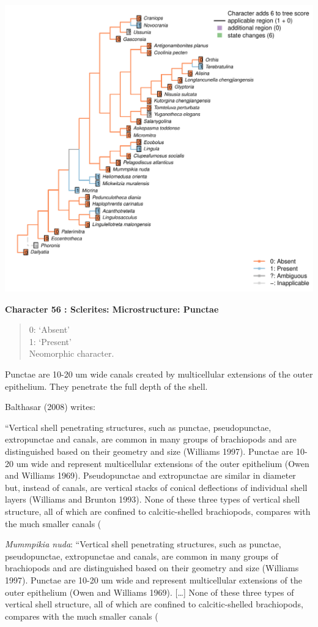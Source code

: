 \documentclass[]{book}
\theoremstyle{definition}
\theoremstyle{definition}
\theoremstyle{definition}
\theoremstyle{remark}
\begin{document}
\includegraphics{Brachiopod_phylogeny_files/figure-latex/unnamed-chunk-5-56.pdf}

\textbf{Character 56 : Sclerites: Microstructure: Punctae }

\begin{quote}
0: `Absent'\\
1: `Present'\\
Neomorphic character.
\end{quote}

Punctae are 10-20 um wide canals created by multicellular extensions of
the outer epithelium. They penetrate the full depth of the shell.

Balthasar (2008) writes:

``Vertical shell penetrating structures, such as punctae, pseudopunctae,
extropunctae and canals, are common in many groups of brachiopods and
are distinguished based on their geometry and size (Williams 1997).
Punctae are 10-20 um wide and represent multicellular extensions of the
outer epithelium (Owen and Williams 1969). Pseudopunctae and
extropunctae are similar in diameter but, instead of canals, are
vertical stacks of conical deflections of individual shell layers
(Williams and Brunton 1993). None of these three types of vertical shell
structure, all of which are confined to calcitic-shelled brachiopods,
compares with the much smaller canals (

\emph{Mummpikia nuda}: ``Vertical shell penetrating structures, such as
punctae, pseudopunctae, extropunctae and canals, are common in many
groups of brachiopods and are distinguished based on their geometry and
size (Williams 1997). Punctae are 10-20 um wide and represent
multicellular extensions of the outer epithelium (Owen and Williams
1969). {[}\ldots{}{]} None of these three types of vertical shell
structure, all of which are confined to calcitic-shelled brachiopods,
compares with the much smaller canals (
\end{document}

